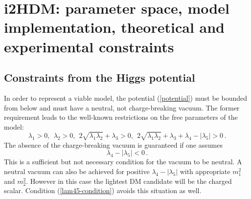 \documentclass[12pt,a4paper]{article}
\begin{document}
\section{i2HDM: parameter space, model implementation,  theoretical and experimental  constraints}

%

\subsection{Constraints from the Higgs potential}\label{sec:2a}

In order to represent a viable model, the potential (\ref{potential}) must be bounded from below
and must have a neutral, not charge-breaking vacuum.
The former requirement leads to the well-known restrictions on the free parameters of the model:
\begin{equation}
\lambda_1>0,\ \  \lambda_2>0,\ \ 
2\sqrt{\lambda_1\lambda_2}+\lambda_3>0,\ \ 
2\sqrt{\lambda_1\lambda_2}+\lambda_3+\lambda_4 - |\lambda_5|>0\,.
\end{equation}
The absence of the charge-breaking vacuum is guaranteed if one assumes
\begin{equation}
\lambda_4 - |\lambda_5| < 0\,. \label{lam45-condition}
\end{equation}
This is a sufficient but not necessary condition for the vacuum to be neutral.
A neutral vacuum can also be achieved for positive $\lambda_4 - |\lambda_5|$ with appropriate
$m_1^2$ and $m_2^2$. However in this case the lightest DM candidate will be the charged scalar.
Condition (\ref{lam45-condition}) avoids this situation as well.
\end{document}
